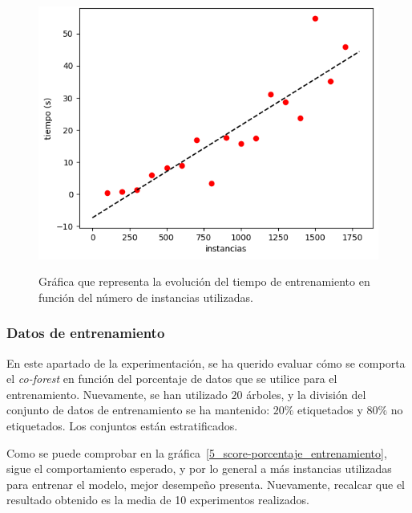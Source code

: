 \begin{figure}[h]
	\caption{Gráfica que representa la evolución del tiempo de entrenamiento en función del número de instancias utilizadas.}
	\centering
	\includegraphics[scale=0.7]{../img/memoria/5_coforest_tiempo-instancias}
	\label{5_coforest_tiempo-instancias}
\end{figure}


\subsubsection{Datos de entrenamiento}

En este apartado de la experimentación, se ha querido evaluar cómo se comporta el \textit{co-forest} en función del porcentaje de datos que se utilice para el entrenamiento. Nuevamente, se han utilizado  $20$ árboles, y la división del conjunto de datos de entrenamiento se ha mantenido: $20\%$ etiquetados y $80\%$ no etiquetados. Los conjuntos están estratificados.

Como se puede comprobar en la gráfica~\ref{5_score-porcentaje_entrenamiento}, sigue el comportamiento esperado, y por lo general a más instancias utilizadas para entrenar el modelo, mejor desempeño presenta. Nuevamente, recalcar que el resultado obtenido es la media de 10 experimentos realizados.

